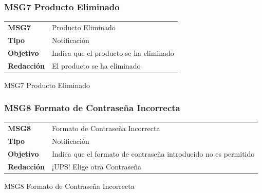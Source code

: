 \documentclass[14pt]{article}
\begin{document}
            \subsubsection{MSG7 Producto Eliminado}\label{MSG7 Producto Eliminado}
                \begin{table}[H]
                    \begin{center}
                        \begin{tabular}{| l | l | } \hline
                        \textbf{MSG7} & Producto Eliminado \\
                        \textbf{Tipo} & Notificación \\
                        \textbf{Objetivo} & Indica que el producto se ha eliminado \\
                        \textbf{Redacción} & El producto se ha eliminado \\  \hline
                        \end{tabular}
                        
                        \vspace{0.3cm} MSG7 Producto Eliminado
                    \end{center}
                \end{table}
                
            \subsubsection{MSG8 Formato de Contraseña Incorrecta}\label{MSG8 Formato de Contraseña Incorrecto}
                \begin{table}[H]
                    \begin{center}
                        \begin{tabular}{| l | l | } \hline
                        \textbf{MSG8} & Formato de Contraseña Incorrecta \\
                        \textbf{Tipo} & Notificación \\
                        \textbf{Objetivo} & Indica que el formato de contraseña introducido no es permitido \\
                        \textbf{Redacción} & ¡UPS! Elige otra Contraseña\\  \hline
                        \end{tabular}
                        
                        \vspace{0.3cm} MSG8 Formato de Contraseña Incorrecta
                    \end{center}
                \end{table}
                
\end{document}
